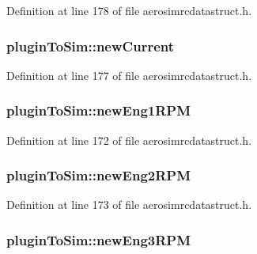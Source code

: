 Definition at line 178 of file aerosimrcdatastruct.\-h.

\hypertarget{group___aero_sim_r_c_ga7fd515830d601c3785dadd02ed64dcc0}{
\subsubsection[{new\-Current}]{ plugin\-To\-Sim\-::new\-Current}}\label{group___aero_sim_r_c_ga7fd515830d601c3785dadd02ed64dcc0}


Definition at line 177 of file aerosimrcdatastruct.\-h.

\hypertarget{group___aero_sim_r_c_ga8e41974881d85220a22aa7b1e10a6c8b}{
\subsubsection[{new\-Eng1\-R\-P\-M}]{ plugin\-To\-Sim\-::new\-Eng1\-R\-P\-M}}\label{group___aero_sim_r_c_ga8e41974881d85220a22aa7b1e10a6c8b}


Definition at line 172 of file aerosimrcdatastruct.\-h.

\hypertarget{group___aero_sim_r_c_gaf9f1bbadaada97aec5a72a47799dbb69}{
\subsubsection[{new\-Eng2\-R\-P\-M}]{ plugin\-To\-Sim\-::new\-Eng2\-R\-P\-M}}\label{group___aero_sim_r_c_gaf9f1bbadaada97aec5a72a47799dbb69}


Definition at line 173 of file aerosimrcdatastruct.\-h.

\hypertarget{group___aero_sim_r_c_ga1c7f49c14ce7325e93375b1973f36b91}{
\subsubsection[{new\-Eng3\-R\-P\-M}]{ plugin\-To\-Sim\-::new\-Eng3\-R\-P\-M}}\label{group___aero_sim_r_c_ga1c7f49c14ce7325e93375b1973f36b91}



